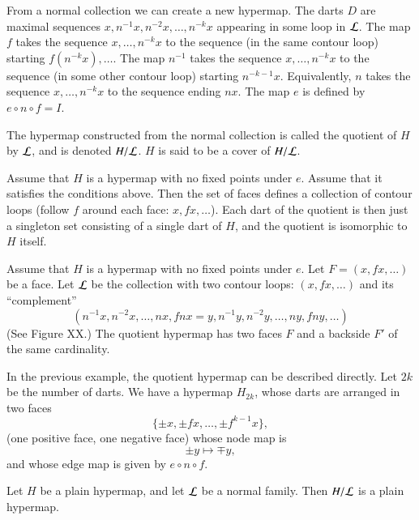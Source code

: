 From a normal collection we can create a new hypermap.   The darts
$D$ are maximal sequences $x,n^{-1} x, n^{-2} x,\ldots,n^{-k} x$
    appearing in some loop in $\cal L$.
The map $f$ takes the sequence
    $x,\ldots,n^{-k}x$ to the sequence (in the same contour loop) starting $f (n^{-k}
    x),\ldots$.
The map $n^{-1}$ takes the sequence
    $x,\ldots,n^{-k}x$ to the sequence (in some other contour loop)
starting $n^{-k-1} x$. Equivalently, $n$ takes the sequence
$x,\ldots,n^{-k}x$ to the sequence ending $n x$. The map $e$ is
defined by $e\circ n\circ f = I$.

\begin{definition}  The hypermap constructed from the normal collection
is called the quotient of $H$ by $\cal L$, and is denoted $H/{\cal
L}$.  $H$ is said to be a cover of $H/{\cal L}$.
\end{definition}

\begin{example} Assume that $H$ is a hypermap with no fixed points under $e$.
Assume that it satisfies the conditions above. Then the set of faces
defines a collection of contour loops (follow $f$ around each face:
$x,f x,\ldots$).  Each dart of the quotient is then just a singleton
set consisting of a single dart of $H$, and the quotient is
isomorphic to $H$ itself.
\end{example}

\begin{example} Assume that $H$ is a hypermap with no fixed points
under $e$.  Let $F = (x,f x,\ldots)$ be a face.  Let $\cal L$ be the
collection with two contour loops:  $(x,f x,\ldots)$ and its
``complement''
$$(n^{-1} x,
n^{-2} x,\ldots,n x,f n x = y,n^{-1} y, n^{-2} y,\ldots, n y, f n
y,\ldots)
$$
(See Figure XX.) The quotient hypermap has two faces $F$ and a
backside $F'$ of the same cardinality.
\end{example}

\begin{example} In the previous example, the quotient hypermap can
be described directly.  Let $2k$ be the number of darts.  We have a
hypermap $H_{2k}$, whose darts are arranged in two faces
    $$\{\pm x,\pm f x,\ldots, \pm f^{k-1} x\},$$
(one positive face, one negative face) whose node map is
    $$\pm y \mapsto \mp y,$$
and whose edge map is given by $e\circ n\circ f$.
\end{example}

\begin{lemma} Let $H$ be a plain hypermap, and let $\cal L$ be a
normal family.  Then $H/{\cal L}$ is a plain hypermap.
\end{lemma}

